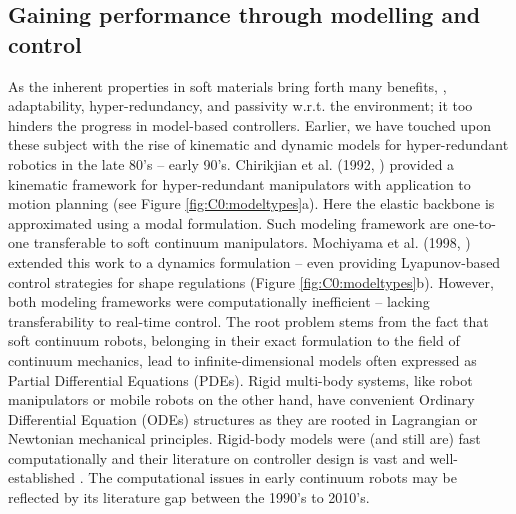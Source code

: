 \subsection{Gaining performance through modelling and control}
\label{sec:C0:modelcontrol}
As the inherent properties in soft materials bring forth many benefits, \eg, adaptability, hyper-redundancy, and passivity w.r.t. the environment; it too hinders the progress in model-based controllers. Earlier, we have touched upon these subject with the rise of kinematic and dynamic models for hyper-redundant robotics in the late 80's -- early 90's. Chirikjian et al. (1992, \cite{Chirikjian1992}) provided a kinematic framework for hyper-redundant manipulators with application to motion planning (see Figure \ref{fig:C0:modeltypes}a). Here the elastic backbone is approximated using a modal formulation. Such modeling framework are one-to-one transferable to soft continuum manipulators. Mochiyama et al. (1998, \cite{Mochiyama1998,Mochiyama2003}) extended this work to a dynamics formulation -- even providing Lyapunov-based control strategies for shape regulations (Figure \ref{fig:C0:modeltypes}b). However, both modeling frameworks were computationally inefficient -- lacking transferability to real-time control. The root problem stems from the fact that soft continuum robots, belonging in their exact formulation to the field of continuum mechanics, lead to infinite-dimensional models often expressed as Partial Differential Equations (PDEs). Rigid multi-body systems, like robot manipulators or mobile robots on the other hand, have convenient Ordinary Differential Equation (ODEs) structures as they are rooted in Lagrangian or Newtonian mechanical principles. Rigid-body models were (and still are) fast computationally and their literature on controller design is vast and well-established \cite{Murray1994,Corke2011,Spong2006}. The computational issues in early continuum robots may be reflected by its literature gap between the 1990's to 2010's.

